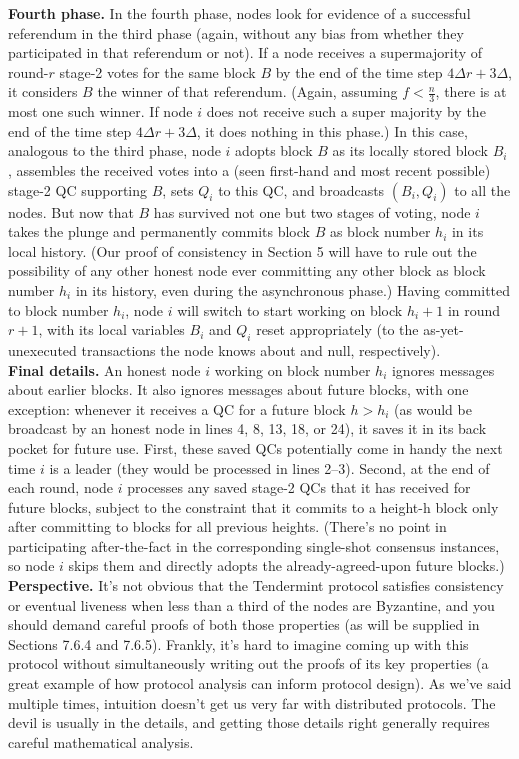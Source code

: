 \noindent
\textbf{Fourth phase.} 
In the fourth phase, nodes look for evidence of a successful referendum
in the third phase (again, without any bias from whether they participated in
that referendum or not). If a node receives a supermajority of round-$r$ stage-2 votes for the same
block $B$ by the end of the time step  $4\Delta r + 3\Delta$, it considers $B$ the winner of that referendum.
(Again, assuming $f < \frac{n}{3}$, there is at most one such winner. If node $i$ does not receive such a
super majority by the end of the time step  $4\Delta r + 3\Delta$, it does nothing in this phase.) In this case,
analogous to the third phase, node $i$ adopts block $B$ as its locally stored block $B_i$
, assembles the received votes into a (seen first-hand and most recent possible) stage-2 QC supporting $B$,
sets $Q_i$ to this QC, and broadcasts $(B_i, Q_i)$ to all the nodes. But now that $B$ has survived
not one but two stages of voting, node $i$ takes the plunge and permanently commits block $B$
as block number $h_i$
in its local history. (Our proof of consistency in Section 5 will have to
rule out the possibility of any other honest node ever committing any other block as block
number $h_i$ in its history, even during the asynchronous phase.) Having committed to
block number $h_i$, node $i$ will switch to start working on block $h_i + 1$ in round $r + 1$, with
its local variables $B_i$ and $Q_i$ reset appropriately (to the as-yet-unexecuted transactions the
node knows about and null, respectively).\\

\noindent
\textbf{Final details.} 
An honest node $i$ working on block number $h_i$ ignores messages about earlier blocks. It also ignores messages about future blocks, with one exception: whenever it
receives a QC for a future block $h > h_i$ (as would be broadcast by an honest node in lines 4, 8,
13, 18, or 24), it saves it in its back pocket for future use. First, these saved QCs potentially
come in handy the next time $i$ is a leader (they would be processed in lines 2–3). Second, at
the end of each round, node $i$ processes any saved stage-2 QCs that it has received for future
blocks, subject to the constraint that it commits to a height-h block only after committing
to blocks for all previous heights. (There’s no point in participating after-the-fact in the
corresponding single-shot consensus instances, so node $i$ skips them and directly adopts the
already-agreed-upon future blocks.)\\

\noindent
\textbf{Perspective.} 
It’s not obvious that the Tendermint protocol satisfies consistency or
eventual liveness when less than a third of the nodes are Byzantine, and you should demand
careful proofs of both those properties (as will be supplied in Sections 7.6.4 and 7.6.5). Frankly, it’s
hard to imagine coming up with this protocol without simultaneously writing out the proofs
of its key properties (a great example of how protocol analysis can inform protocol design).
As we've said multiple times, intuition doesn't get us very far with distributed protocols.
The devil is usually in the details, and getting those details right generally requires careful
mathematical analysis.


